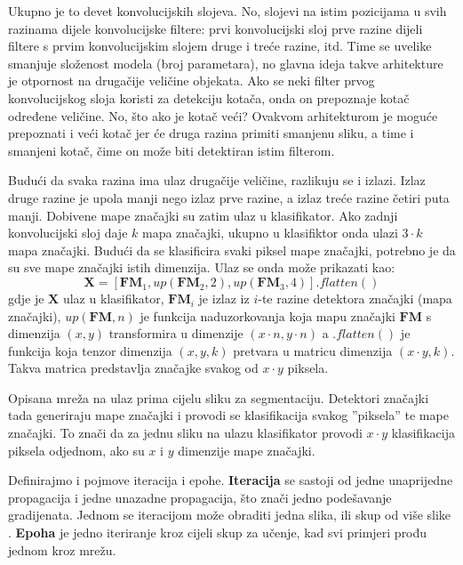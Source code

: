 \documentclass[times, utf8, diplomski, numeric]{fer}
\begin{document}
Ukupno je to devet konvolucijskih slojeva. No, slojevi na istim pozicijama u svih razinama dijele konvolucijske filtere: prvi konvolucijski sloj prve razine dijeli filtere s prvim konvolucijskim slojem druge i treće razine, itd. Time se uvelike smanjuje složenost modela (broj parametara), no glavna ideja takve arhitekture je otpornost na drugačije veličine objekata. Ako se neki filter prvog konvolucijskog sloja koristi za detekciju kotača, onda on prepoznaje kotač određene veličine. No, što ako je kotač veći? Ovakvom arhitekturom je moguće prepoznati i veći kotač jer će druga razina primiti smanjenu sliku, a time i smanjeni kotač, čime on može biti detektiran istim filterom.

Budući da svaka razina ima ulaz drugačije veličine, razlikuju se i izlazi. Izlaz druge razine je upola manji nego izlaz prve razine, a izlaz treće razine četiri puta manji. Dobivene mape značajki su zatim ulaz u klasifikator. Ako zadnji konvolucijski sloj daje $k$ mapa značajki, ukupno u klasifiktor onda ulazi $3 \cdot k$ mapa značajki. Budući da se klasificira svaki piksel mape značajki, potrebno je da su sve mape značajki istih dimenzija. Ulaz se onda može prikazati kao:
\begin{equation}
	\boldsymbol{X} = [\boldsymbol{FM}_1, up(\boldsymbol{FM}_2, 2), up(\boldsymbol{FM}_3, 4)].flatten()
\end{equation}
gdje je $\boldsymbol{X}$ ulaz u klasifikator, $\boldsymbol{FM}_i$ je izlaz iz $i$-te razine detektora značajki (mapa značajki), $up(\boldsymbol{FM}, n)$ je funkcija naduzorkovanja koja mapu značajki $\boldsymbol{FM}$ s dimenzija $(x, y)$ transformira u dimenzije $(x \cdot n, y\cdot n)$ a $.flatten()$ je funkcija koja tenzor dimenzija $(x, y, k)$ pretvara u matricu dimenzija $(x \cdot y, k)$. Takva matrica predstavlja značajke svakog od $x \cdot y$ piksela.

Opisana mreža na ulaz prima cijelu sliku za segmentaciju. Detektori značajki tada generiraju mape značajki i provodi se klasifikacija svakog ''piksela'' te mape značajki. To znači da za jednu sliku na ulazu klasifikator provodi $x \cdot y$ klasifikacija piksela odjednom, ako su $x$ i $y$ dimenzije mape značajki.

Definirajmo i pojmove iteracija i epohe. \textbf{Iteracija} se sastoji od jedne unaprijedne propagacija i jedne unazadne propagacija, što znači jedno podešavanje gradijenata. Jednom se iteracijom može obraditi jedna slika, ili skup od više slike . \textbf{Epoha} je jedno iteriranje kroz cijeli skup za učenje, kad svi primjeri prođu jednom kroz mrežu.
\end{document}
